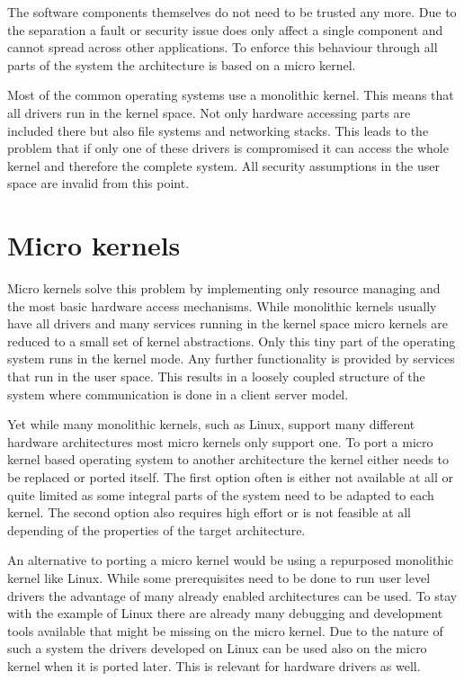 \documentclass[
a4paper,
12pt,
notitlepage,
parskip=half,
DIV=11,
]{scrbook}
\begin{document}
	The software components themselves do not need to be trusted any more.
	Due to the separation a fault or security issue does only affect a single component and cannot spread across other applications.
	To enforce this behaviour through all parts of the system the architecture is based on a micro kernel.
	
	Most of the common operating systems use a monolithic kernel.
	This means that all drivers run in the kernel space.
	Not only hardware accessing parts are included there but also file systems and networking stacks.
	This leads to the problem that if only one of these drivers is compromised it can access the whole kernel and therefore the complete system.
	All security assumptions in the user space are invalid from this point.
	
	\section{Micro kernels}
	
	Micro kernels solve this problem by implementing only resource managing and the most basic hardware access mechanisms.
	While monolithic kernels usually have all drivers and many services running in the kernel space micro kernels are reduced to a small set of kernel abstractions.
	Only this tiny part of the operating system runs in the kernel mode.
	Any further functionality is provided by services that run in the user space.
	This results in a loosely coupled structure of the system where communication is done in a client server model. \citep{minix}
	
	Yet while many monolithic kernels, such as Linux, support many different hardware architectures most micro kernels only support one.
	To port a micro kernel based operating system to another architecture the kernel either needs to be replaced or ported itself.
	The first option often is either not available at all or quite limited as some integral parts of the system need to be adapted to each kernel.
	The second option also requires high effort or is not feasible at all depending of the properties of the target architecture.
	
	An alternative to porting a micro kernel would be using a repurposed monolithic kernel like Linux.
	While some prerequisites need to be done to run user level drivers the advantage of many already enabled architectures can be used.
	To stay with the example of Linux there are already many debugging and development tools available that might be missing on the micro kernel.
	Due to the nature of such a system the drivers developed on Linux can be used also on the micro kernel when it is ported later.
	This is relevant for hardware drivers as well.
	
\end{document}
